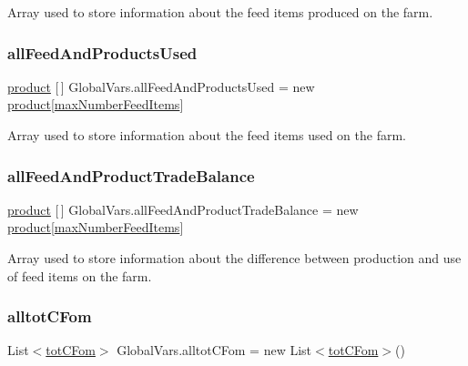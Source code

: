 Array used to store information about the feed items produced on the farm. 

\mbox{\label{class_global_vars_aa390108dd9539b57fdfa53809a6834f1}} 
\subsubsection{\texorpdfstring{allFeedAndProductsUsed}{allFeedAndProductsUsed}}
{\footnotesize\ttfamily \mbox{\hyperlink{class_global_vars_1_1product}{product}} \mbox{[}$\,$\mbox{]} Global\+Vars.\+all\+Feed\+And\+Products\+Used = new \mbox{\hyperlink{class_global_vars_1_1product}{product}}\mbox{[}\mbox{\hyperlink{class_global_vars_a42fa58d4be2a863e36b4ec8e8bee69cd}{max\+Number\+Feed\+Items}}\mbox{]}}



Array used to store information about the feed items used on the farm. 

\mbox{\label{class_global_vars_a19c42ff016a916b57aaece2194efae34}} 
\subsubsection{\texorpdfstring{allFeedAndProductTradeBalance}{allFeedAndProductTradeBalance}}
{\footnotesize\ttfamily \mbox{\hyperlink{class_global_vars_1_1product}{product}} \mbox{[}$\,$\mbox{]} Global\+Vars.\+all\+Feed\+And\+Product\+Trade\+Balance = new \mbox{\hyperlink{class_global_vars_1_1product}{product}}\mbox{[}\mbox{\hyperlink{class_global_vars_a42fa58d4be2a863e36b4ec8e8bee69cd}{max\+Number\+Feed\+Items}}\mbox{]}}



Array used to store information about the difference between production and use of feed items on the farm. 

\mbox{\label{class_global_vars_a8053b09fd5b316711e87abb39ef0e07c}} 
\subsubsection{\texorpdfstring{alltotCFom}{alltotCFom}}
{\footnotesize\ttfamily List$<$\mbox{\hyperlink{struct_global_vars_1_1tot_c_fom}{tot\+C\+Fom}}$>$ Global\+Vars.\+alltot\+C\+Fom = new List$<$\mbox{\hyperlink{struct_global_vars_1_1tot_c_fom}{tot\+C\+Fom}}$>$()}



